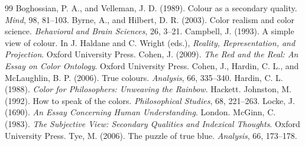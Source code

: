 \documentclass{situationist-preprint}
\begin{document}
\begin{thebibliography}{99}\small
{} Boghossian, P. A., and Velleman, J. D. (1989). Colour as a secondary quality. \emph{Mind}, 98, 81--103.
 Byrne, A., and Hilbert, D. R. (2003). Color realism and color science. \emph{Behavioral and Brain Sciences}, 26, 3--21.
 Campbell, J. (1993). A simple view of colour. In J. Haldane and C. Wright (eds.), \emph{Reality, Representation, and Projection}. Oxford University Press.
 Cohen, J. (2009). \emph{The Red and the Real: An Essay on Color Ontology}. Oxford University Press.
 Cohen, J., Hardin, C. L., and McLaughlin, B. P. (2006). True colours. \emph{Analysis}, 66, 335--340.
 Hardin, C. L. (1988). \emph{Color for Philosophers: Unweaving the Rainbow}. Hackett.
 Johnston, M. (1992). How to speak of the colors. \emph{Philosophical Studies}, 68, 221--263.
 Locke, J. (1690). \emph{An Essay Concerning Human Understanding}. London.
 McGinn, C. (1983). \emph{The Subjective View: Secondary Qualities and Indexical Thoughts}. Oxford University Press.
 Tye, M. (2006). The puzzle of true blue. \emph{Analysis}, 66, 173--178.
\end{thebibliography}
\end{document}
